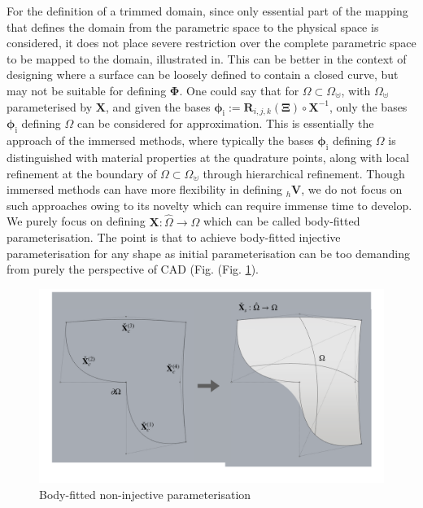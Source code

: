 For the definition of a trimmed domain, since only essential part of the mapping that defines the domain from the parametric space to the physical space is considered, it does not place severe restriction over the complete parametric space to be mapped to the domain, illustrated in. This can be better in the context of designing where a surface can be loosely defined to contain a closed curve, but may not be suitable for defining $\bm \Phi$. One could say that for $\Omega \subset \Omega_{\uplus}$, with $\Omega_{\uplus}$ parameterised by $\bm X$, and given the bases $\bm \phi_\mathrm{i}:= \bm R_{i,j,k}(\mathbf{\Xi}) \circ \bm{X}^{-1}$, only the bases $\bm \phi_\mathrm{i}$ defining $\Omega$ can be considered for approximation. 
This is essentially the approach of the immersed methods, where typically the bases $\bm \phi_\mathrm{i}$ defining $\Omega$ is distinguished with material properties at the quadrature points, along with local refinement at the boundary of $\Omega\subset\Omega_{\uplus}$ through hierarchical refinement. Though immersed methods can have more flexibility in defining ${}_h \bm V$, we do not focus on such approaches owing to its novelty which can require immense time to develop.
 We purely focus on defining $\bm X:\hat\Omega\rightarrow\Omega$ which can be called body-fitted parameterisation. 
 The point is that to achieve body-fitted injective parameterisation for any shape as initial parameterisation can be too demanding from purely the perspective of CAD (Fig. (Fig. \ref{fig:body_neg}). 
 
 \begin{figure}[h!]
    \centering
    \includegraphics[scale=0.25]{Chapter5/Pictures/body_neg}
    \caption{Body-fitted non-injective parameterisation }
    \label{fig:body_neg}
\end{figure}


